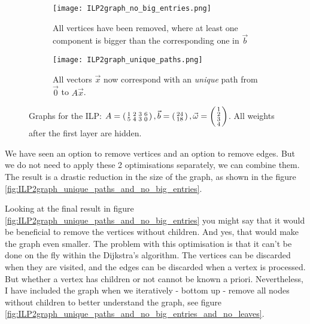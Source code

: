 \begin{figure}
    \centering
    \begin{subfigure}[b]{0.45\textwidth}
        \texttt{[image: ILP2graph\_no\_big\_entries.png]}
        \caption{All vertices have been removed, where at least one component is bigger than the corresponding one in $\vec b$}
        \label{fig:ILP2graph_no_big_entries}
    \end{subfigure}
    \hfill
    \begin{subfigure}[b]{0.45\textwidth}
        \texttt{[image: ILP2graph\_unique\_paths.png]}
        \caption{All vectors $\vec x$ now correspond with an \textit{unique} path from $\vec 0$ to $A\vec x$.}
        \label{fig:ILP2graph_unique_paths}
    \end{subfigure}
    \caption{Graphs for the ILP: $A = \left(\begin{smallmatrix}1&2&3&6\\5&4&3&0\end{smallmatrix}\right), \vec b = \left(\begin{smallmatrix}24\\18\end{smallmatrix}\right), \vec \omega = \left(\begin{smallmatrix}1\\2\\3\\4\end{smallmatrix}\right)$. All weights after the first layer are hidden.}
\end{figure}

We have seen an option to remove vertices and an option to remove edges. But we do not need to apply these 2 optimisations separately, we can combine them. The result is a drastic reduction in the size of the graph, as shown in the figure \ref{fig:ILP2graph_unique_paths_and_no_big_entries}.

Looking at the final result in figure \ref{fig:ILP2graph_unique_paths_and_no_big_entries} you might say that it would be beneficial to remove the vertices without children. And yes, that would make the graph even smaller. The problem with this optimisation is that it can't be done on the fly within the Dijkstra's algorithm. The vertices can be discarded when they are visited, and the edges can be discarded when a vertex is processed. But whether a vertex has children or not cannot be known a priori. Nevertheless, I have included the graph when we iteratively - bottom up - remove all nodes without children to better understand the graph, see figure \ref{fig:ILP2graph_unique_paths_and_no_big_entries_and_no_leaves}.

